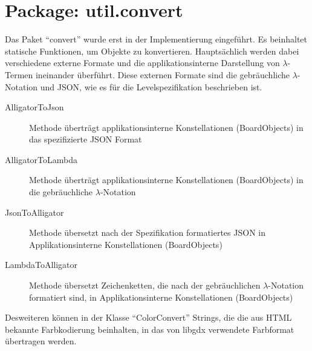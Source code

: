 \section{Package: util.convert}
Das Paket "`convert"' wurde erst in der Implementierung eingeführt.
Es beinhaltet statische Funktionen, um Objekte zu konvertieren.
Hauptsächlich werden dabei verschiedene externe Formate und die applikationsinterne Darstellung von \(\lambda\)-Termen ineinander überführt.
Diese externen Formate sind die gebräuchliche \(\lambda\)-Notation und JSON, wie es für die Levelspezifikation beschrieben ist.
\begin{description}
	\item[AlligatorToJson] Methode überträgt applikationsinterne Konstellationen (BoardObjects) in das spezifizierte JSON Format
	\item[AlligatorToLambda] Methode überträgt applikationsinterne Konstellationen (BoardObjects) in die gebräuchliche \(\lambda\)-Notation
	\item[JsonToAlligator] Methode übersetzt nach der Spezifikation formatiertes JSON in Applikationsinterne Konstellationen (BoardObjects)
	\item[LambdaToAlligator] Methode übersetzt Zeichenketten, die nach der gebräuchlichen \(\lambda\)-Notation formatiert sind, in Applikationsinterne Konstellationen (BoardObjects)
\end{description}
Desweiteren können in der Klasse "`ColorConvert"' Strings, die die aus HTML bekannte Farbkodierung beinhalten, in das von libgdx verwendete Farbformat übertragen werden.
